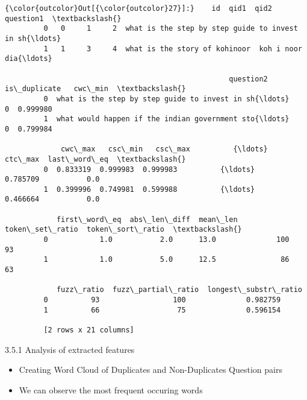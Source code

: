 \documentclass[11pt]{article}
\providecommand{\tightlist}{%
      \setlength{\itemsep}{0pt}\setlength{\parskip}{0pt}}
\begin{document}
\begin{Verbatim}[commandchars=\\\{\}]
{\color{outcolor}Out[{\color{outcolor}27}]:}    id  qid1  qid2                                          question1  \textbackslash{}
         0   0     1     2  what is the step by step guide to invest in sh{\ldots}   
         1   1     3     4  what is the story of kohinoor  koh i noor  dia{\ldots}   
         
                                                    question2  is\_duplicate   cwc\_min  \textbackslash{}
         0  what is the step by step guide to invest in sh{\ldots}             0  0.999980   
         1  what would happen if the indian government sto{\ldots}             0  0.799984   
         
             cwc\_max   csc\_min   csc\_max          {\ldots}            ctc\_max  last\_word\_eq  \textbackslash{}
         0  0.833319  0.999983  0.999983          {\ldots}           0.785709           0.0   
         1  0.399996  0.749981  0.599988          {\ldots}           0.466664           0.0   
         
            first\_word\_eq  abs\_len\_diff  mean\_len  token\_set\_ratio  token\_sort\_ratio  \textbackslash{}
         0            1.0           2.0      13.0              100                93   
         1            1.0           5.0      12.5               86                63   
         
            fuzz\_ratio  fuzz\_partial\_ratio  longest\_substr\_ratio  
         0          93                 100              0.982759  
         1          66                  75              0.596154  
         
         [2 rows x 21 columns]
\end{Verbatim}
            
    3.5.1 Analysis of extracted features

    \begin{itemize}
\tightlist
\item
  Creating Word Cloud of Duplicates and Non-Duplicates Question pairs
\item
  We can observe the most frequent occuring words
\end{itemize}
\end{document}
